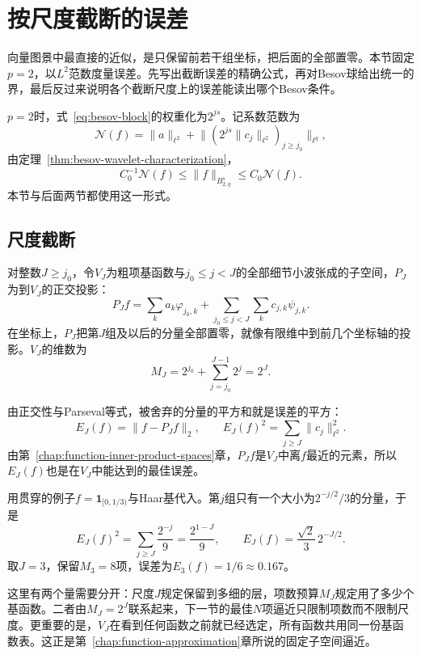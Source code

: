 \section{按尺度截断的误差}
\label{sec:besov-scale-truncation}

向量图景中最直接的近似，是只保留前若干组坐标，把后面的全部置零。本节固定$p=2$，以$L^2$范数度量误差。先写出截断误差的精确公式，再对Besov球给出统一的界，最后反过来说明各个截断尺度上的误差能读出哪个Besov条件。

$p=2$时，式~\eqref{eq:besov-block}的权重化为$2^{js}$。记系数范数为
\[
 \mathcal N(f)=\lVert a\rVert_{\ell^2}+\bigl\lVert(2^{js}\lVert c_j\rVert_{\ell^2})_{j\geq j_0}\bigr\rVert_{\ell^q},
\]
由定理~\ref{thm:besov-wavelet-characterization}，
\begin{equation}
 C_0^{-1}\mathcal N(f)\leq\lVert f\rVert_{B^s_{2,q}}\leq C_0\mathcal N(f).
 \label{eq:besov-wavelet-norm-l2}
\end{equation}
本节与后面两节都使用这一形式。

\subsection{尺度截断}
\label{sec:besov-truncation}

对整数$J\geq j_0$，令$V_J$为粗项基函数与$j_0\leq j<J$的全部细节小波张成的子空间，$P_J$为到$V_J$的正交投影：
\[
 P_Jf=\sum_ka_k\varphi_{j_0,k}+\sum_{j_0\leq j<J}\sum_kc_{j,k}\psi_{j,k} .
\]
在坐标上，$P_J$把第$J$组及以后的分量全部置零，就像有限维中到前几个坐标轴的投影。$V_J$的维数为
\[
 M_J=2^{j_0}+\sum_{j=j_0}^{J-1}2^j=2^J .
\]

由正交性与Parseval等式，被舍弃的分量的平方和就是误差的平方：
\begin{equation}
 E_J(f)=\lVert f-P_Jf\rVert_2,\qquad E_J(f)^2=\sum_{j\geq J}\lVert c_j\rVert_{\ell^2}^2 .
 \label{eq:besov-truncation-error}
\end{equation}
由第~\ref{chap:function-inner-product-spaces}章，$P_Jf$是$V_J$中离$f$最近的元素，所以$E_J(f)$也是在$V_J$中能达到的最佳误差。

用贯穿的例子$f=\mathbf 1_{[0,1/3)}$与Haar基代入。第$j$组只有一个大小为$2^{-j/2}/3$的分量，于是
\[
 E_J(f)^2=\sum_{j\geq J}\frac{2^{-j}}{9}=\frac{2^{1-J}}{9},\qquad E_J(f)=\frac{\sqrt2}{3}\,2^{-J/2}.
\]
取$J=3$，保留$M_3=8$项，误差为$E_3(f)=1/6\approx0.167$。

这里有两个量需要分开：尺度$J$规定保留到多细的层，项数预算$M_J$规定用了多少个基函数。二者由$M_J=2^J$联系起来，下一节的最佳$N$项逼近只限制项数而不限制尺度。更重要的是，$V_J$在看到任何函数之前就已经选定，所有函数共用同一份基函数表。这正是第~\ref{chap:function-approximation}章所说的固定子空间逼近。

